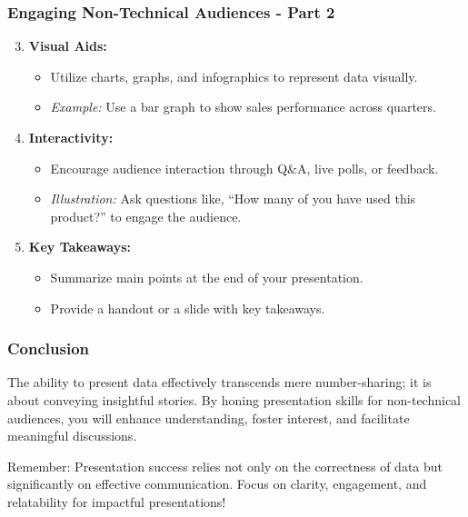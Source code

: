 \documentclass[aspectratio=169]{beamer}
\begin{document}
\begin{frame}[fragile]
    \frametitle{Engaging Non-Technical Audiences - Part 2}
    \begin{enumerate}
        \setcounter{enumi}{2} %
        \item \textbf{Visual Aids:}
            \begin{itemize}
                \item Utilize charts, graphs, and infographics to represent data visually.
                \item \textit{Example:} Use a bar graph to show sales performance across quarters.
            \end{itemize}
        \item \textbf{Interactivity:}
            \begin{itemize}
                \item Encourage audience interaction through Q&A, live polls, or feedback.
                \item \textit{Illustration:} Ask questions like, “How many of you have used this product?” to engage the audience.
            \end{itemize}
        \item \textbf{Key Takeaways:}
            \begin{itemize}
                \item Summarize main points at the end of your presentation.
                \item Provide a handout or a slide with key takeaways.
            \end{itemize}
    \end{enumerate}
\end{frame}

\begin{frame}[fragile]
    \frametitle{Conclusion}
    \begin{block}{}
        The ability to present data effectively transcends mere number-sharing; it is about conveying insightful stories. 
        By honing presentation skills for non-technical audiences, you will enhance understanding, foster interest, and facilitate meaningful discussions.
    \end{block}
    \begin{block}{Remember:}
        Presentation success relies not only on the correctness of data but significantly on effective communication.
        Focus on clarity, engagement, and relatability for impactful presentations!
    \end{block}
\end{frame}
\end{document}

